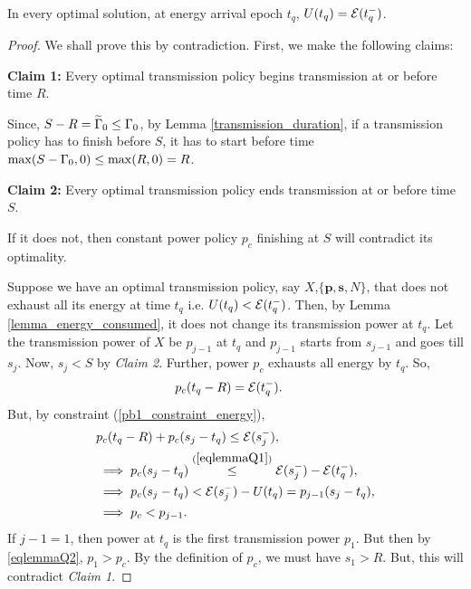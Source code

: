 \begin{lemma}
In every optimal solution, at energy arrival epoch $t_q$, $U(t_q)=\mathcal{E}(t_q^-)$.
\label{lemma_Q}
\end{lemma}
\begin{proof}
We shall prove this by contradiction. First, we make the following claims:

\textbf{Claim 1:} Every optimal transmission policy begins transmission at or before time $R$.

Since, $S-R=\widetilde{\Gamma}_0\le \Gamma_0$, by Lemma \ref{transmission_duration}, if a transmission policy has to finish before $S$, it has to start before time $\max(S-\Gamma_0,0) \le \max(R,0)=R$. 


\textbf{Claim 2:} Every optimal transmission policy ends transmission at or before time $S$.

If it does not, then constant power policy $p_c$ finishing at $S$ will contradict its optimality.

Suppose we have an optimal transmission policy, say $X$,$\{\bm{p},\bm{s},N\}$, that does not exhaust all its energy at time $t_q$ i.e. $U(t_q)<\mathcal{E}(t_q^-)$. Then, by Lemma \ref{lemma_energy_consumed}, it does not change its transmission power at $t_q$. Let the transmission power of $X$ be $p_{j-1}$ at $t_q$ and $p_{j-1}$ starts from $s_{j-1}$ and goes till $s_j$. Now, $s_j<S$ by \textit{Claim 2}. Further, power $p_c$ exhausts all energy by $t_q$. So,
\begin{align}
&p_c(t_q-R)=\ETx(t_q^-)\label{eqlemmaQ1}.
\end{align}
But, by constraint (\ref{pb1_constraint_energy}),
\begin{align}
&p_c(t_q-R)+p_c(s_j-t_q)\le \ETx(s_j^-),
\\
&\implies p_c(s_j-t_q)\stackrel{(\ref{eqlemmaQ1})}{\le} \ETx(s_j^-)-\ETx(t_q^-),
\\
&\implies p_c(s_j-t_q)< \ETx(s_j^-)-U(t_q)=p_{j-1}(s_j-t_q),
\\
&\implies p_c<p_{j-1} .\label{eqlemmaQ2}
\end{align}
If ${j-1}= 1$, then power at $t_q$ is the first transmission power $p_1$. But then by \eqref{eqlemmaQ2}, $p_1 > p_c$. By the definition of $p_c$, we must have $s_{1} > R$. But, this will contradict \textit{Claim 1}.


\end{proof}
